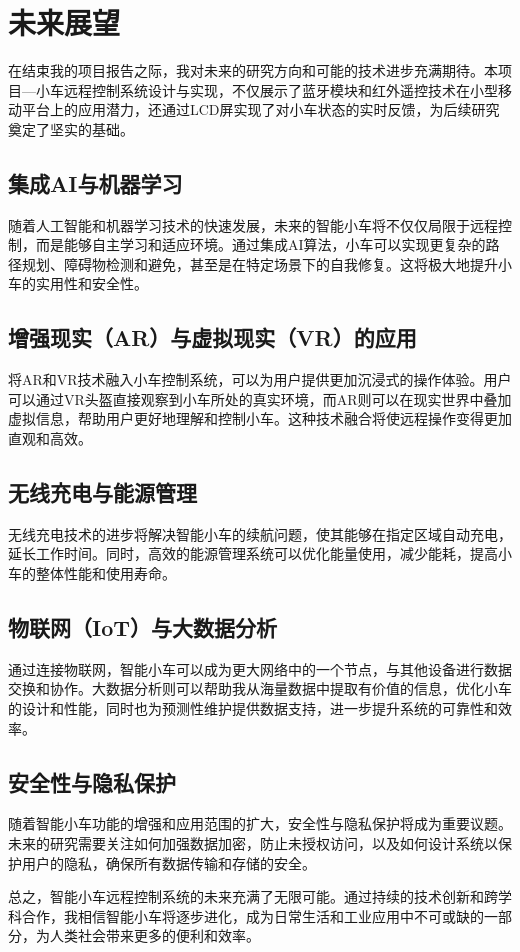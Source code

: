 \section{未来展望}
在结束我的项目报告之际，我对未来的研究方向和可能的技术进步充满期待。本项目—小车远程控制系统设计与实现，不仅展示了蓝牙模块和红外遥控技术在小型移动平台上的应用潜力，还通过LCD屏实现了对小车状态的实时反馈，为后续研究奠定了坚实的基础。

\subsection{集成AI与机器学习}

随着人工智能和机器学习技术的快速发展，未来的智能小车将不仅仅局限于远程控制，而是能够自主学习和适应环境。通过集成AI算法，小车可以实现更复杂的路径规划、障碍物检测和避免，甚至是在特定场景下的自我修复。这将极大地提升小车的实用性和安全性。

\subsection{增强现实（AR）与虚拟现实（VR）的应用}

将AR和VR技术融入小车控制系统，可以为用户提供更加沉浸式的操作体验。用户可以通过VR头盔直接观察到小车所处的真实环境，而AR则可以在现实世界中叠加虚拟信息，帮助用户更好地理解和控制小车。这种技术融合将使远程操作变得更加直观和高效。

\subsection{无线充电与能源管理}

无线充电技术的进步将解决智能小车的续航问题，使其能够在指定区域自动充电，延长工作时间。同时，高效的能源管理系统可以优化能量使用，减少能耗，提高小车的整体性能和使用寿命。

\subsection{物联网（IoT）与大数据分析}

通过连接物联网，智能小车可以成为更大网络中的一个节点，与其他设备进行数据交换和协作。大数据分析则可以帮助我从海量数据中提取有价值的信息，优化小车的设计和性能，同时也为预测性维护提供数据支持，进一步提升系统的可靠性和效率。

\subsection{安全性与隐私保护}

随着智能小车功能的增强和应用范围的扩大，安全性与隐私保护将成为重要议题。未来的研究需要关注如何加强数据加密，防止未授权访问，以及如何设计系统以保护用户的隐私，确保所有数据传输和存储的安全。
\newline

总之，智能小车远程控制系统的未来充满了无限可能。通过持续的技术创新和跨学科合作，我相信智能小车将逐步进化，成为日常生活和工业应用中不可或缺的一部分，为人类社会带来更多的便利和效率。